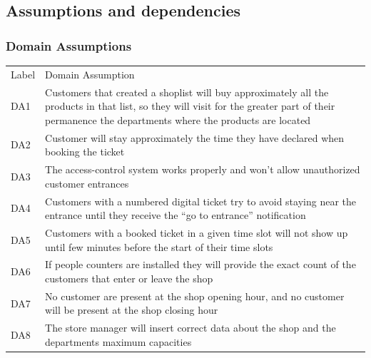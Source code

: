 \vfill

\subsection{Assumptions and dependencies}
\subsubsection{Domain Assumptions}

\renewcommand{\arraystretch}{1.4}
\begin{tabular}{C{1cm}L{14.1cm}}
    Label & Domain Assumption                                                                                                                                                                                  \\

    DA1   & Customers that created a shoplist will buy approximately all the products in that list, so they will visit for the greater part of their permanence the departments where the products are located \\

    DA2   & Customer will stay approximately the time they have declared when booking the ticket                                                                                                               \\

    DA3   & The access-control system works properly and won't allow unauthorized customer entrances                                                                                                           \\

    DA4   & Customers with a numbered digital ticket try to avoid staying near the entrance until they receive the ``go to entrance'' notification                                                            \\

    DA5   & Customers with a booked ticket in a given time slot will not show up until few minutes before the start of their time slots                                                                        \\

    DA6   & If people counters are installed they will provide the exact count of the customers that enter or leave the shop                                                                                   \\

    DA7   & No customer are present at the shop opening hour, and no customer will be present at the shop closing hour                                                                                         \\

    DA8   & The store manager will insert correct data about the shop and the departments maximum capacities                                                                                                   \\
\end{tabular}

